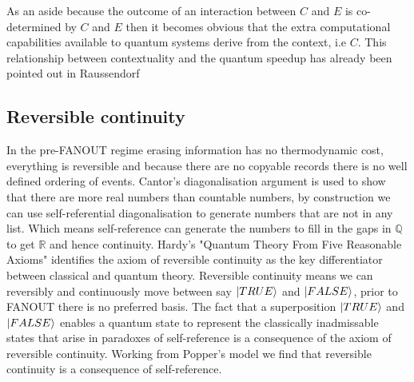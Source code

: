 As an aside because the outcome of an interaction between $C$ and $E$ is co-determined by $C$ and $E$ then it becomes obvious that the extra computational capabilities available to quantum systems derive from the context, i.e $C$. This relationship between contextuality and the quantum speedup has already been pointed out in Raussendorf \autocite{Raussendorf2009ContextualityComputation}

\subsection{Reversible continuity}
\label{sec:reversible-continuity}
In the pre-FANOUT regime erasing information has no thermodynamic cost, everything is reversible and because there are no copyable records there is no well defined ordering of events. Cantor's diagonalisation argument is used to show that there are more real numbers than countable numbers, by construction we can use self-referential diagonalisation to generate numbers that are not in any list. Which means self-reference can generate the numbers to fill in the gaps in $\mathbb{Q}$ to get $\mathbb{R}$ and hence continuity. Hardy's "Quantum Theory From Five Reasonable Axioms" \autocite{Hardy2001a} identifies the axiom of reversible continuity as the key differentiator between classical and quantum theory. Reversible continuity means we can reversibly and continuously move between say $\ket{TRUE}$ and $\ket{FALSE}$, prior to FANOUT there is no preferred basis. The fact that a superposition $\ket{TRUE}$ and $\ket{FALSE}$ enables a quantum state to represent the classically inadmissable states that arise in paradoxes of self-reference is a consequence of the axiom of reversible continuity. Working from Popper's model we find that reversible continuity is a consequence of self-reference. 

